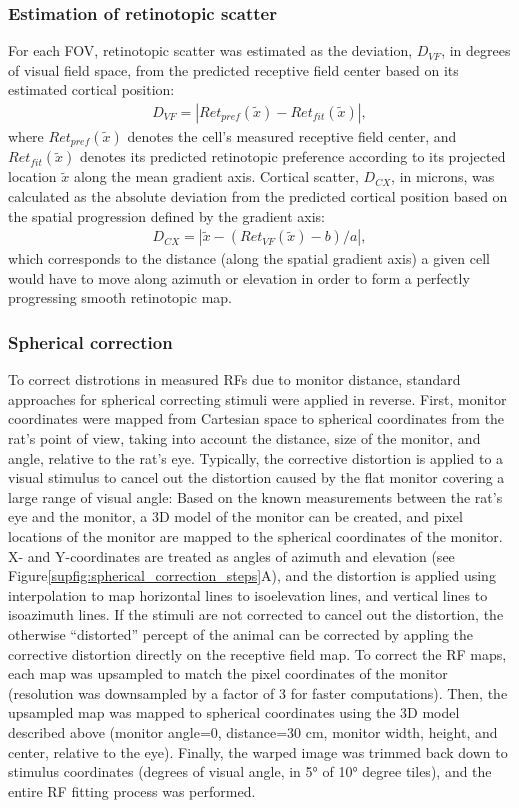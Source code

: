 \subsubsection{Estimation of retinotopic scatter}
For each FOV, retinotopic scatter was estimated as the deviation, $D_{VF}$, in degrees of visual field space, from the predicted receptive field center based on its estimated cortical position:
\begin{align}
    D_{VF}=|Ret_{pref}(\tilde{x}) - Ret_{fit}(\tilde{x})|, 
\end{align}
where $Ret_{pref}(\tilde{x})$ denotes the cell's measured receptive field center, and $Ret_{fit}(\tilde{x})$ denotes its predicted retinotopic preference according to its projected location $\tilde{x}$ along the mean gradient axis. Cortical scatter, $D_{CX}$, in microns, was calculated as the absolute deviation from the predicted cortical position based on the spatial progression defined by the gradient axis:
\begin{align}
    D_{CX}=|\tilde{x}-(Ret_{VF}(\tilde{x})-b)/a|, 
\end{align}
which corresponds to the distance (along the spatial gradient axis) a given cell would have to move along azimuth or elevation in order to form a perfectly progressing smooth retinotopic map. 

\subsubsection{Spherical correction}
To correct distrotions in measured RFs due to monitor distance, standard approaches for spherical correcting stimuli were applied in reverse\cite{Labrigger2012}. First, monitor coordinates were mapped from Cartesian space to spherical coordinates from the rat's point of view, taking into account the distance, size of the monitor, and angle, relative to the rat's eye. Typically, the corrective distortion is applied to a visual stimulus to cancel out the distortion caused by the flat monitor covering a large range of visual angle: Based on the known measurements between the rat's eye and the monitor, a 3D model of the monitor can be created, and pixel locations of the monitor are mapped to the spherical coordinates of the monitor. X- and Y-coordinates are treated as angles of azimuth and elevation (see Figure\ref{supfig:spherical_correction_steps}A), and the distortion is applied using interpolation to map horizontal lines to isoelevation lines, and vertical lines to isoazimuth lines. If the stimuli are not corrected to cancel out the distortion, the otherwise ``distorted'' percept of the animal can be corrected by appling the corrective distortion directly on the receptive field map. To correct the RF maps, each map was upsampled to match the pixel coordinates of the monitor (resolution was downsampled by a factor of 3 for faster computations). Then, the upsampled map was mapped to spherical coordinates using the 3D model described above (monitor angle=0, distance=30 cm, monitor width, height, and center, relative to the eye). Finally, the warped image was trimmed back down to stimulus coordinates (degrees of visual angle, in \ang{5} of \ang{10} degree tiles), and the entire RF fitting process was performed. 

